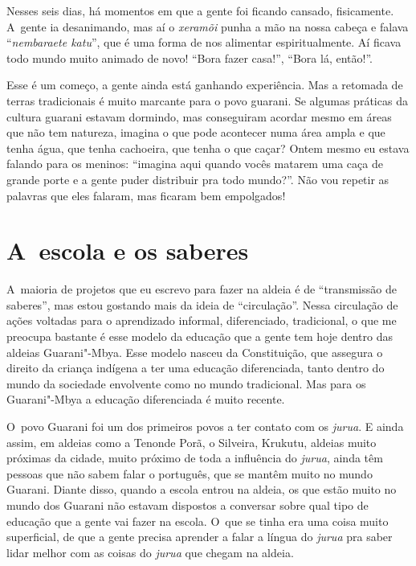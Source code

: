 Nesses seis dias, há momentos em que a gente foi ficando cansado,
fisicamente. A~gente ia desanimando, mas aí o \emph{xeramõi} punha a mão na
nossa cabeça e falava ``\emph{nembaraete katu}'', que é uma forma de nos
alimentar espiritualmente. Aí ficava todo mundo muito animado de novo!
``Bora fazer casa!'', ``Bora lá, então!''. 

Esse é um começo, a gente ainda está ganhando experiência. Mas a
retomada de terras tradicionais é muito marcante para o povo guarani.
Se algumas práticas da cultura guarani estavam dormindo, mas
conseguiram acordar mesmo em áreas que não tem natureza, imagina o que
pode acontecer numa área ampla e que tenha água, que tenha cachoeira,
que tenha o que caçar? Ontem mesmo eu estava falando para os meninos:
``imagina aqui quando vocês matarem uma caça de grande porte e a gente
puder distribuir pra todo mundo?''. Não vou repetir as palavras que eles
falaram, mas ficaram bem empolgados!

\section{A~escola e os saberes}

A~maioria de projetos que eu escrevo para fazer na aldeia é de
``transmissão de saberes'', mas estou gostando mais da ideia de
``circulação''. Nessa circulação de ações voltadas para o aprendizado
informal, diferenciado, tradicional, o que me preocupa bastante é esse
modelo da educação que a gente tem hoje dentro das aldeias
Guarani"-Mbya. Esse modelo nasceu da Constituição, que assegura o
direito da criança indígena a ter uma educação diferenciada, tanto
dentro do mundo da sociedade envolvente como no mundo tradicional. Mas
para os Guarani"-Mbya a educação diferenciada é muito recente.

O~povo Guarani foi um dos primeiros povos a ter contato com os \emph{jurua}. E
ainda assim, em aldeias como a Tenonde Porã, o Silveira, Krukutu,
aldeias muito próximas da cidade, muito próximo de toda a influência do
\emph{jurua}, ainda têm pessoas que não sabem falar o português, que se mantêm
muito no mundo Guarani. Diante disso, quando a escola entrou na aldeia,
os que estão muito no mundo dos Guarani não estavam dispostos a
conversar sobre qual tipo de educação que a gente vai fazer na escola.
O~que se tinha era uma coisa muito superficial, de que a gente precisa
aprender a falar a língua do \emph{jurua} pra saber lidar melhor com as coisas
do \emph{jurua} que chegam na aldeia. 


